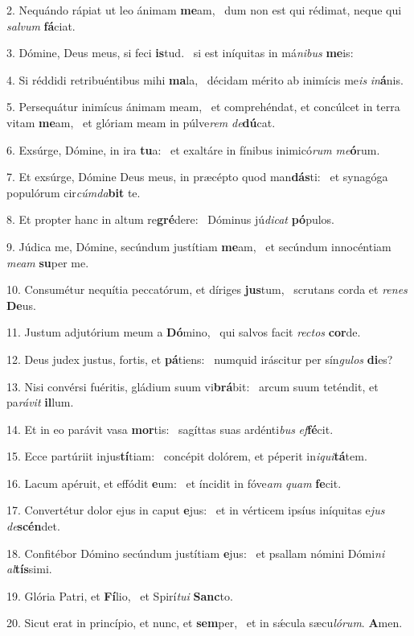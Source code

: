 2. Nequándo rápiat ut leo ánimam \textbf{me}am, \ast\  dum non est qui rédimat, neque qui \textit{sal}\textit{vum} \textbf{fá}ciat.\

3. Dómine, Deus meus, si feci \textbf{is}tud. \ast\  si est iníquitas in má\textit{ni}\textit{bus} \textbf{me}is:\

4. Si réddidi retribuéntibus mihi \textbf{ma}la, \ast\  décidam mérito ab inimícis me\textit{is} \textit{in}\textbf{á}nis.\

5. Persequátur inimícus ánimam meam, \dag\  et comprehéndat, et concúlcet in terra vitam \textbf{me}am, \ast\  et glóriam meam in púlve\textit{rem} \textit{de}\textbf{dú}cat.\

6. Exsúrge, Dómine, in ira \textbf{tu}a: \ast\  et exaltáre in fínibus inimicó\textit{rum} \textit{me}\textbf{ó}rum.\

7. Et exsúrge, Dómine Deus meus, in præcépto quod man\textbf{dás}ti: \ast\  et synagóga populórum cir\textit{cúm}\textit{da}\textbf{bit} te.\

8. Et propter hanc in altum re\textbf{gré}dere: \ast\  Dóminus jú\textit{di}\textit{cat} \textbf{pó}pulos.\

9. Júdica me, Dómine, secúndum justítiam \textbf{me}am, \ast\  et secúndum innocéntiam \textit{me}\textit{am} \textbf{su}per me.\

10. Consumétur nequítia peccatórum, et díriges \textbf{jus}tum, \ast\  scrutans corda et \textit{re}\textit{nes} \textbf{De}us.\

11. Justum adjutórium meum a \textbf{Dó}mino, \ast\  qui salvos facit \textit{rec}\textit{tos} \textbf{cor}de.\

12. Deus judex justus, fortis, et \textbf{pá}tiens: \ast\  numquid iráscitur per sín\textit{gu}\textit{los} \textbf{di}es?\

13. Nisi convérsi fuéritis, gládium suum vi\textbf{brá}bit: \ast\  arcum suum teténdit, et pa\textit{rá}\textit{vit} \textbf{il}lum.\

14. Et in eo parávit vasa \textbf{mor}tis: \ast\  sagíttas suas ardénti\textit{bus} \textit{ef}\textbf{fé}cit.\

15. Ecce partúriit injus\textbf{tí}tiam: \ast\  concépit dolórem, et péperit in\textit{i}\textit{qui}\textbf{tá}tem.\

16. Lacum apéruit, et effódit \textbf{e}um: \ast\  et íncidit in fóve\textit{am} \textit{quam} \textbf{fe}cit.\

17. Convertétur dolor ejus in caput \textbf{e}jus: \ast\  et in vérticem ipsíus iníquitas e\textit{jus} \textit{de}\textbf{scén}det.\

18. Confitébor Dómino secúndum justítiam \textbf{e}jus: \ast\  et psallam nómini Dómi\textit{ni} \textit{al}\textbf{tís}simi.\

19. Glória Patri, et \textbf{Fí}lio, \ast\  et Spirí\textit{tu}\textit{i} \textbf{Sanc}to.\

20. Sicut erat in princípio, et nunc, et \textbf{sem}per, \ast\  et in sǽcula sæcu\textit{ló}\textit{rum}. \textbf{A}men.\

